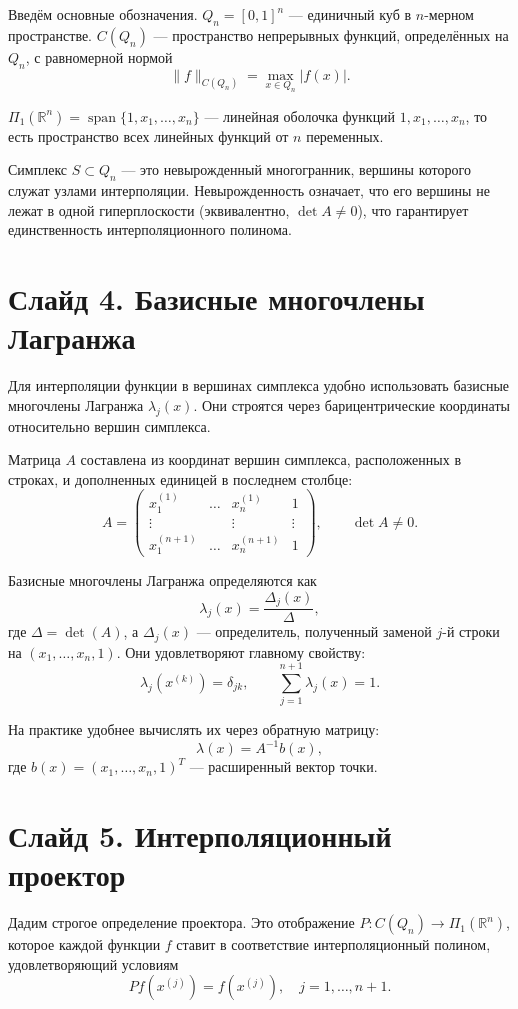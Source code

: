 \documentclass[a4paper,12pt]{article}
\begin{document}
Введём основные обозначения. $Q_n = [0,1]^n$ — единичный куб в $n$-мерном пространстве. $C(Q_n)$ — пространство непрерывных функций, определённых на $Q_n$, с равномерной нормой
\[
\|f\|_{C(Q_n)} = \max_{x \in Q_n} |f(x)|.
\]

$\Pi_1(\mathbb{R}^n) = \operatorname{span}\{1, x_1, \dots, x_n\}$ — линейная оболочка функций $1, x_1, \dots, x_n$, то есть пространство всех линейных функций от $n$ переменных.

Симплекс $S \subset Q_n$ — это невырожденный многогранник, вершины которого служат узлами интерполяции. Невырожденность означает, что его вершины не лежат в одной гиперплоскости (эквивалентно, $\det A \neq 0$), что гарантирует единственность интерполяционного полинома.

\section*{Слайд 4. Базисные многочлены Лагранжа}

Для интерполяции функции в вершинах симплекса удобно использовать базисные многочлены Лагранжа $\lambda_j(x)$. Они строятся через барицентрические координаты относительно вершин симплекса.

Матрица $A$ составлена из координат вершин симплекса, расположенных в строках, и дополненных единицей в последнем столбце:
\[
A = \begin{pmatrix}
x_1^{(1)} & \dots & x_n^{(1)} & 1 \\
\vdots & & \vdots & \vdots \\
x_1^{(n+1)} & \dots & x_n^{(n+1)} & 1
\end{pmatrix}, \qquad \det A \neq 0.
\]

Базисные многочлены Лагранжа определяются как
\[
\lambda_j(x) = \frac{\Delta_j(x)}{\Delta},
\]
где $\Delta = \det(A)$, а $\Delta_j(x)$ — определитель, полученный заменой $j$-й строки на $(x_1,\dots,x_n,1)$. Они удовлетворяют главному свойству:
\[
\lambda_j(x^{(k)}) = \delta_{jk}, \qquad \sum_{j=1}^{n+1} \lambda_j(x) = 1.
\]

На практике удобнее вычислять их через обратную матрицу:
\[
\lambda(x) = A^{-1} b(x),
\]
где $b(x) = (x_1, \dots, x_n, 1)^T$ — расширенный вектор точки.

\section*{Слайд 5. Интерполяционный проектор}

Дадим строгое определение проектора. Это отображение $P: C(Q_n) \to \Pi_1(\mathbb{R}^n)$, которое каждой функции $f$ ставит в соответствие интерполяционный полином, удовлетворяющий условиям
\[
P f(x^{(j)}) = f(x^{(j)}), \quad j = 1,\dots,n+1.
\]
\end{document}
